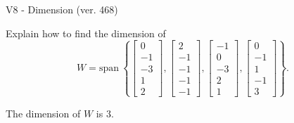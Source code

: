 \begin{exercise}
  \begin{exerciseTitle}V8 - Dimension (ver. 468)\end{exerciseTitle}
  \begin{exerciseStatement}
    Explain how to find the dimension of 
\[W=\mathrm{span}\ \left\{\left[\begin{array}{r}
0 \\
-1 \\
-3 \\
1 \\
2
\end{array}\right] , \left[\begin{array}{r}
2 \\
-1 \\
-1 \\
-1 \\
-1
\end{array}\right] , \left[\begin{array}{r}
-1 \\
0 \\
-3 \\
2 \\
1
\end{array}\right] , \left[\begin{array}{r}
0 \\
-1 \\
1 \\
-1 \\
3
\end{array}\right]\right\}.\]



  \end{exerciseStatement}
  \begin{exerciseAnswer}
   The dimension of \(W\) is  \(3\).
  


  \end{exerciseAnswer}
\end{exercise}
